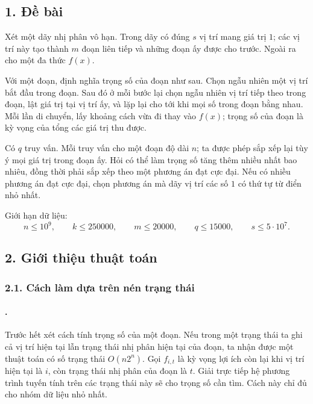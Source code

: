 \documentclass[11pt]{article}
\begin{document}
\subsection*{1. Đề bài}

Xét một dãy nhị phân vô hạn. Trong dãy có đúng \(s\) vị trí mang giá trị
\(1\); các vị trí này tạo thành \(m\) đoạn liên tiếp và những đoạn ấy được cho
trước. Ngoài ra cho một đa thức \(f(x)\).

Với một đoạn, định nghĩa trọng số của đoạn như sau. Chọn ngẫu nhiên một vị trí
bắt đầu trong đoạn. Sau đó ở mỗi bước lại chọn ngẫu nhiên vị trí tiếp theo
trong đoạn, lật giá trị tại vị trí ấy, và lặp lại cho tới khi mọi số trong
đoạn bằng nhau. Mỗi lần di chuyển, lấy khoảng cách vừa đi thay vào \(f(x)\);
trọng số của đoạn là kỳ vọng của tổng các giá trị thu được.

Có \(q\) truy vấn. Mỗi truy vấn cho một đoạn độ dài \(n\); ta được phép sắp
xếp lại tùy ý mọi giá trị trong đoạn ấy. Hỏi có thể làm trọng số tăng thêm
nhiều nhất bao nhiêu, đồng thời phải sắp xếp theo một phương án đạt cực đại.
Nếu có nhiều phương án đạt cực đại, chọn phương án mà dãy vị trí các số \(1\)
có thứ tự từ điển nhỏ nhất.

Giới hạn dữ liệu:
\[
  n\le 10^9,\qquad k\le 250000,\qquad m\le 20000,\qquad
  q\le 15000,\qquad s\le 5\cdot 10^7.
\]

\subsection*{2. Giới thiệu thuật toán}

\subsubsection*{2.1. Cách làm dựa trên nén trạng thái}

\paragraph{.}
Trước hết xét cách tính trọng số của một đoạn. Nếu trong một trạng thái ta
ghi cả vị trí hiện tại lẫn trạng thái nhị phân hiện tại của đoạn, ta nhận
được một thuật toán có số trạng thái \(O(n2^n)\). Gọi \(f_{i,t}\) là kỳ vọng
lợi ích còn lại khi vị trí hiện tại là \(i\), còn trạng thái nhị phân của đoạn
là \(t\). Giải trực tiếp hệ phương trình tuyến tính trên các trạng thái này
sẽ cho trọng số cần tìm. Cách này chỉ đủ cho nhóm dữ liệu nhỏ nhất.
\end{document}
